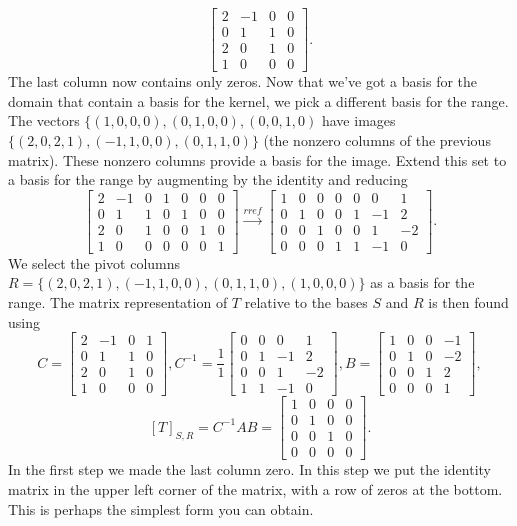 \begin{example}
$$\begin{bmatrix}
 2 & -1 & 0 & 0 \\
 0 & 1 & 1 & 0 \\
 2 & 0 & 1 & 0 \\
 1 & 0 & 0 & 0
\end{bmatrix}.$$ 
The last column now contains only zeros. Now that we've got a basis for the domain that contain a basis for the kernel, we pick a different basis for the range.
The vectors $\{(1,0,0,0),(0,1,0,0),(0,0,1,0)$ have images $\{(2,0,2,1),(-1,1,0,0),(0,1,1,0)\}$ (the nonzero columns of the previous matrix). These nonzero columns provide a basis for the image.  Extend this set to a basis for the range by augmenting by the identity and reducing
$$\begin{bmatrix}
 2 & -1 & 0 & 1 & 0 & 0 & 0 \\
 0 & 1 & 1 & 0 & 1 & 0 & 0 \\
 2 & 0 & 1 & 0 & 0 & 1 & 0 \\
 1 & 0 & 0 & 0 & 0 & 0 & 1
\end{bmatrix}
\xrightarrow{rref}
\begin{bmatrix}
 1 & 0 & 0 & 0 & 0 & 0 & 1 \\
 0 & 1 & 0 & 0 & 1 & -1 & 2 \\
 0 & 0 & 1 & 0 & 0 & 1 & -2 \\
 0 & 0 & 0 & 1 & 1 & -1 & 0
\end{bmatrix}.
$$ 
We select the pivot columns $R = \{(2,0,2,1),(-1,1,0,0),(0,1,1,0),(1,0,0,0)\}$ as a basis for the range. 
The matrix representation of $T$ relative to the bases $S$ and $R$ is then found using 
$$C=
\begin{bmatrix}
 2 & -1 & 0 & 1 \\
 0 & 1 & 1 & 0 \\
 2 & 0 & 1 & 0 \\
 1 & 0 & 0 & 0
\end{bmatrix},
C^{-1} = \frac{1}{1}
\begin{bmatrix}
 0 & 0 & 0 & 1 \\
 0 & 1 & -1 & 2 \\
 0 & 0 & 1 & -2 \\
 1 & 1 & -1 & 0
\end{bmatrix},
B=
\begin{bmatrix}
 1 & 0 & 0 & -1 \\
 0 & 1 & 0 & -2 \\
 0 & 0 & 1 & 2 \\
 0 & 0 & 0 & 1
\end{bmatrix},$$
$$[T]_{S,R} = C^{-1}AB= 
\begin{bmatrix}
 1 & 0 & 0 & 0 \\
 0 & 1 & 0 & 0 \\
 0 & 0 & 1 & 0 \\
 0 & 0 & 0 & 0
\end{bmatrix}.$$ In the first step we made the last column zero. In this step we put the identity matrix in the upper left corner of the matrix, with a row of zeros at the bottom. 
This is perhaps the simplest form you can obtain.
\end{example}

